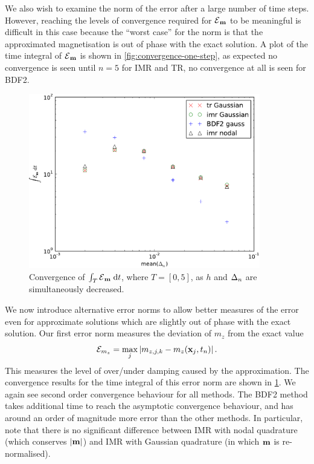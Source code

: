 We also wish to examine the norm of the error after a large number of time steps.
However, reaching the levels of convergence required for $\mathcal{E}{}_{\boldsymbol{\mathrm{m}}}$ to be meaningful is difficult in this case because the ``worst case'' for the norm is that the approximated magnetisation is out of phase with the exact solution.
A plot of the time integral of $\mathcal{E}{}_{\boldsymbol{\mathrm{m}}}$ is shown in \cref{fig:convergence-one-step}, as expected no convergence is seen until $n=5$ for IMR and TR, no convergence at all is seen for BDF2.
\begin{figure}
  \centering
  \includegraphics[width=0.9\textwidth]{plots/2d_wave_solution_convergence_long_time/errornormintegralvsmeanofdts.pdf}
  \caption{Convergence of ${\int_T {\mathcal{E}{}_{\boldsymbol{\mathrm{m}}}} {\; \mathrm{{d}}} t}$, where $T=[0,5]$, as $h$ and $\Delta_{n}$ are simultaneously decreased.}
  \label{fig:convergence-long-time-full-norm}
\end{figure}



We now introduce alternative error norms to allow better measures of the error even for approximate solutions which are slightly out of phase with the exact solution.
Our first error norm measures the deviation of $m_z$ from the exact value
\begin{equation}
  \mathcal{E}_{m_z} = \max_j \left|{m_{z,j,k} - m_z(\boldsymbol{\mathrm{x}}_j, t_n)} \right|.
\end{equation}
This measures the level of over/under damping caused by the approximation.
The convergence results for the time integral of this error norm are shown in \cref{fig:convergence-long-time-full-norm}.
We again see second order convergence behaviour for all methods.
The BDF2 method takes additional time to reach the asymptotic convergence behaviour, and has around an order of magnitude more error than the other methods.
In particular, note that there is no significant difference between IMR with nodal quadrature (which conserves $\left|{\boldsymbol{\mathrm{m}}} \right|$) and IMR with Gaussian quadrature (in which $\boldsymbol{\mathrm{m}}$ is re-normalised).

